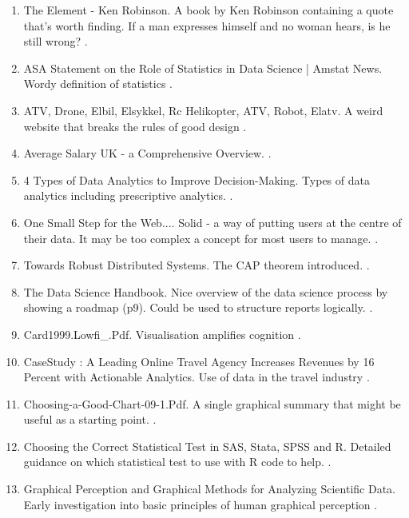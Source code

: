 \documentclass[a4paper]{article}
\begin{document}
\begin{enumerate}

\item The Element - Ken Robinson. A book by Ken Robinson containing a quote that's worth finding. If a man expresses himself and no woman hears, is he still wrong? \parencite{anaElementKenRobinson}.
\item ASA Statement on the Role of Statistics in Data Science | Amstat News. Wordy definition of statistics \parencite{ASAStatementRole2015}.
\item ATV, Drone, Elbil, Elsykkel, Rc Helikopter, ATV, Robot, Elatv. A weird website that breaks the rules of good design \parencite{ATVDroneElbil2022}.
\item Average Salary UK - a Comprehensive Overview.  \parencite{AverageSalaryUK2021}.
\item 4 Types of Data Analytics to Improve Decision-Making. Types of data analytics including prescriptive analytics. \parencite{bekkerTypesDataAnalytics2019}.
\item One Small Step for the Web.... Solid - a way of putting users at the centre of their data. It may be too complex a concept for most users to manage. \parencite{berners-leeOneSmallStep2018}.
\item Towards Robust Distributed Systems. The CAP theorem introduced. \parencite{brewerRobustDistributedSystems2000}.
\item The Data Science Handbook. Nice overview of the data science process by showing a roadmap (p9). Could be used to structure reports logically. \parencite{cadyDataScienceHandbook2017}.
\item Card1999.Lowfi\_.Pdf. Visualisation amplifies cognition \parencite{cardCard1999LowfiPdf1999}.
\item CaseStudy : A Leading Online Travel Agency Increases Revenues by 16 Percent with Actionable Analytics. Use of data in the travel industry \parencite{CaseStudyLeadingOnline2015}.
\item Choosing-a-Good-Chart-09-1.Pdf. A single graphical summary that might be useful as a starting point. \parencite{Choosingagoodchart091Pdf}.
\item Choosing the Correct Statistical Test in SAS, Stata, SPSS and R. Detailed guidance on which statistical test to use with R code to help. \parencite{ChoosingCorrectStatistical}.
\item Graphical Perception and Graphical Methods for Analyzing Scientific Data. Early investigation into basic principles of human graphical perception \parencite{clevelandGraphicalPerceptionGraphical1985}.

\end{enumerate}
\end{document}

